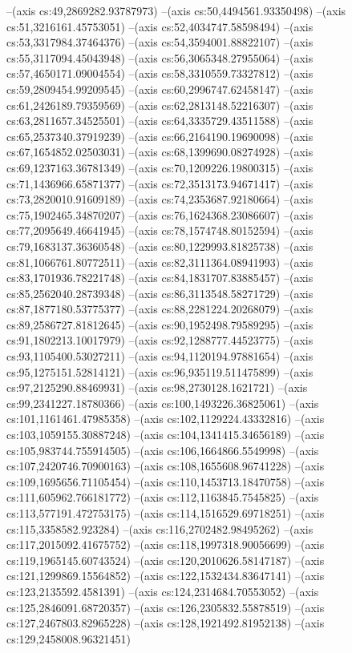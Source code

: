 --(axis cs:49,2869282.93787973)
--(axis cs:50,4494561.93350498)
--(axis cs:51,3216161.45753051)
--(axis cs:52,4034747.58598494)
--(axis cs:53,3317984.37464376)
--(axis cs:54,3594001.88822107)
--(axis cs:55,3117094.45043948)
--(axis cs:56,3065348.27955064)
--(axis cs:57,4650171.09004554)
--(axis cs:58,3310559.73327812)
--(axis cs:59,2809454.99209545)
--(axis cs:60,2996747.62458147)
--(axis cs:61,2426189.79359569)
--(axis cs:62,2813148.52216307)
--(axis cs:63,2811657.34525501)
--(axis cs:64,3335729.43511588)
--(axis cs:65,2537340.37919239)
--(axis cs:66,2164190.19690098)
--(axis cs:67,1654852.02503031)
--(axis cs:68,1399690.08274928)
--(axis cs:69,1237163.36781349)
--(axis cs:70,1209226.19800315)
--(axis cs:71,1436966.65871377)
--(axis cs:72,3513173.94671417)
--(axis cs:73,2820010.91609189)
--(axis cs:74,2353687.92180664)
--(axis cs:75,1902465.34870207)
--(axis cs:76,1624368.23086607)
--(axis cs:77,2095649.46641945)
--(axis cs:78,1574748.80152594)
--(axis cs:79,1683137.36360548)
--(axis cs:80,1229993.81825738)
--(axis cs:81,1066761.80772511)
--(axis cs:82,3111364.08941993)
--(axis cs:83,1701936.78221748)
--(axis cs:84,1831707.83885457)
--(axis cs:85,2562040.28739348)
--(axis cs:86,3113548.58271729)
--(axis cs:87,1877180.53775377)
--(axis cs:88,2281224.20268079)
--(axis cs:89,2586727.81812645)
--(axis cs:90,1952498.79589295)
--(axis cs:91,1802213.10017979)
--(axis cs:92,1288777.44523775)
--(axis cs:93,1105400.53027211)
--(axis cs:94,1120194.97881654)
--(axis cs:95,1275151.52814121)
--(axis cs:96,935119.511475899)
--(axis cs:97,2125290.88469931)
--(axis cs:98,2730128.1621721)
--(axis cs:99,2341227.18780366)
--(axis cs:100,1493226.36825061)
--(axis cs:101,1161461.47985358)
--(axis cs:102,1129224.43332816)
--(axis cs:103,1059155.30887248)
--(axis cs:104,1341415.34656189)
--(axis cs:105,983744.755914505)
--(axis cs:106,1664866.5549998)
--(axis cs:107,2420746.70900163)
--(axis cs:108,1655608.96741228)
--(axis cs:109,1695656.71105454)
--(axis cs:110,1453713.18470758)
--(axis cs:111,605962.766181772)
--(axis cs:112,1163845.7545825)
--(axis cs:113,577191.472753175)
--(axis cs:114,1516529.69718251)
--(axis cs:115,3358582.923284)
--(axis cs:116,2702482.98495262)
--(axis cs:117,2015092.41675752)
--(axis cs:118,1997318.90056699)
--(axis cs:119,1965145.60743524)
--(axis cs:120,2010626.58147187)
--(axis cs:121,1299869.15564852)
--(axis cs:122,1532434.83647141)
--(axis cs:123,2135592.4581391)
--(axis cs:124,2314684.70553052)
--(axis cs:125,2846091.68720357)
--(axis cs:126,2305832.55878519)
--(axis cs:127,2467803.82965228)
--(axis cs:128,1921492.81952138)
--(axis cs:129,2458008.96321451)
